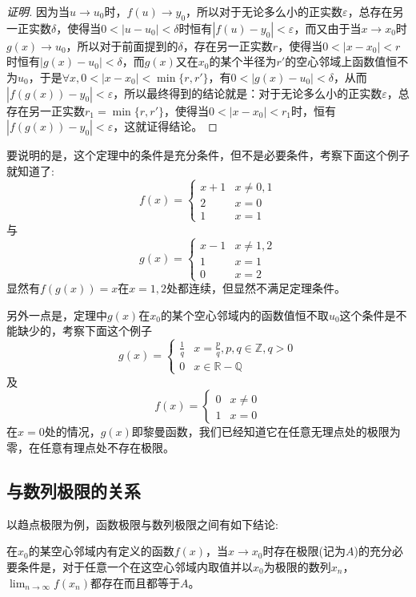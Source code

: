 \begin{proof}[证明]
  因为当$u \to u_0$时，$f(u) \to y_0$，所以对于无论多么小的正实数$\varepsilon$，总存在另一正实数$\delta$，使得当$0<|u-u_0|<\delta$时恒有$|f(u)-y_0|<\varepsilon$，而又由于当$x \to x_0$时$g(x) \to u_0$，所以对于前面提到的$\delta$，存在另一正实数$r$，使得当$0<|x-x_0|<r$时恒有$|g(x)-u_0|<\delta$，而$g(x)$又在$x_0$的某个半径为$r'$的空心邻域上函数值恒不为$u_0$，于是$\forall x,0<|x-x_0|<\min\{r,r'\}$，有$0<|g(x)-u_0|<\delta$，从而$|f(g(x))-y_0|<\varepsilon$，所以最终得到的结论就是：对于无论多么小的正实数$\varepsilon$，总存在另一正实数$r_1=\min\{r,r'\}$，使得当$0<|x-x_0|<r_1$时，恒有$|f(g(x))-y_0|<\varepsilon$，这就证得结论。
\end{proof}

要说明的是，这个定理中的条件是充分条件，但不是必要条件，考察下面这个例子就知道了:
\[ f(x) =
  \begin{cases}
    x+1 & x \neq 0,1 \\
    2 & x=0 \\
    1 & x=1
  \end{cases}
\]
与
\[ g(x) =
  \begin{cases}
    x-1 & x \neq 1,2 \\
    1 & x=1 \\
    0 & x= 2
  \end{cases}
\]
显然有$f(g(x))=x$在$x=1,2$处都连续，但显然不满足定理条件。

另外一点是，定理中$g(x)$在$x_0$的某个空心邻域内的函数值恒不取$u_0$这个条件是不能缺少的，考察下面这个例子
\[ g(x)=
  \begin{cases}
    \frac{1}{q} & x = \frac{p}{q}, p,q \in \mathbb{Z}, q>0 \\
    0 & x \in \mathbb{R}-\mathbb{Q}
  \end{cases}
\]
及
\[ f(x) =
  \begin{cases}
    0 & x \neq 0 \\
    1 & x = 0
  \end{cases}
\]
在$x=0$处的情况，$g(x)$即黎曼函数，我们已经知道它在任意无理点处的极限为零，在任意有理点处不存在极限。

\subsection{与数列极限的关系}
\label{sec:relation-between-limit-of-function-and-number-sequence}

以趋点极限为例，函数极限与数列极限之间有如下结论:
\begin{theorem}[函数极限与数列极限的关系]
  在$x_0$的某空心邻域内有定义的函数$f(x)$，当$x \to x_0$时存在极限(记为$A$)的充分必要条件是，对于任意一个在这空心邻域内取值并以$x_0$为极限的数列$x_n$，$\lim_{n \to \infty}f(x_n)$都存在而且都等于$A$。
\end{theorem}


